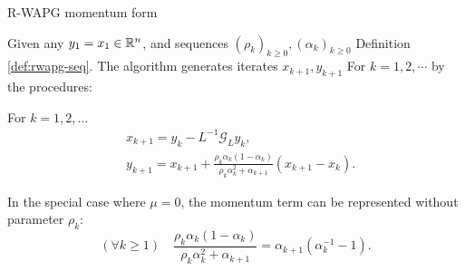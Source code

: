 \documentclass[11pt]{beamer}
\theoremstyle{definition}
\begin{document}
        \begin{frame}{R-WAPG momentum form}
            \begin{definition}\label{def:r-wapg-momentum-form}
                Given any $y_1 = x_1 \in \mathbb R^n$, and sequences $(\rho_k)_{k \ge 0}, (\alpha_k)_{k\ge 0}$ Definition \ref{def:rwapg-seq}. 
                The algorithm generates iterates $x_{k + 1}, y_{k + 1}$ For $k = 1, 2, \cdots $ by the procedures: 
                {\small
                \begin{tcolorbox}
                    For $k=1, 2,\ldots $
                    \begin{align*}
                        & x_{k + 1} = y_k - L^{-1}\mathcal G_Ly_k, 
                        \\
                        & 
                        y_{k + 1} = 
                        x_{k + 1} + 
                        \frac{\rho_k\alpha_k(1 - \alpha_k)}{\rho_k\alpha_k^2 + \alpha_{k + 1}}(x_{k + 1} - x_k). 
                    \end{align*}    
                \end{tcolorbox}
                }
                In the special case where $\mu = 0$, the momentum term can be represented without parameter $\rho_k$: 
                $$
                    (\forall k \ge 1)\quad \frac{\rho_k\alpha_k(1 - \alpha_k)}{\rho_k\alpha_k^2 + \alpha_{k + 1}} 
                    = \alpha_{k + 1}(\alpha_k^{-1} - 1). 
                $$
            \end{definition}
        \end{frame}
\end{document}

